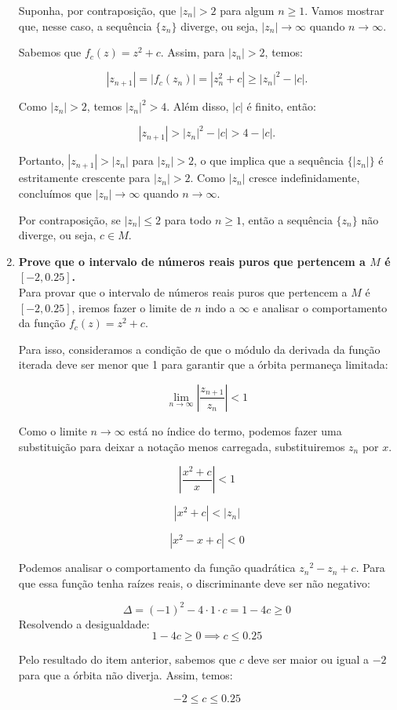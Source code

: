 \begin{enumerate}[label=(\alph*)]
        Suponha, por contraposição, que \( |z_n| > 2 \) para algum \( n \geq 1 \). Vamos mostrar que, nesse caso, a sequência \( \{z_n\} \) diverge, ou seja, \( |z_n| \to \infty \) quando \( n \to \infty \).

        Sabemos que \( f_c(z) = z^2 + c \). Assim, para \( |z_n| > 2 \), temos:

        \[
        |z_{n+1}| = |f_c(z_n)| = |z_n^2 + c| \geq |z_n|^2 - |c|.
        \]

        Como \( |z_n| > 2 \), temos \( |z_n|^2 > 4 \). Além disso, \( |c| \) é finito, então:

        \[
        |z_{n+1}| > |z_n|^2 - |c| > 4 - |c|.
        \]

        Portanto, \( |z_{n+1}| > |z_n| \) para \( |z_n| > 2 \), o que implica que a sequência \( \{|z_n|\} \) é estritamente crescente para \( |z_n| > 2 \). Como \( |z_n| \) cresce indefinidamente, concluímos que \( |z_n| \to \infty \) quando \( n \to \infty \).

        Por contraposição, se \( |z_n| \leq 2 \) para todo \( n \geq 1 \), então a sequência \( \{z_n\} \) não diverge, ou seja, \( c \in M \).


    \item \textbf{Prove que o intervalo de números reais puros que pertencem a \( M \) é \( [-2, 0.25] \). }\\
    
        Para provar que o intervalo de números reais puros que pertencem a \( M \) é \( [-2, 0.25] \), iremos fazer o limite de \( n \) indo a \( \infty \) e analisar o comportamento da função \( f_c(z) = z^2 + c \).

        Para isso, consideramos a condição de que o módulo da derivada da função iterada deve ser menor que 1 para garantir que a órbita permaneça limitada:

        \[
        \lim_{n \to \infty} \left| \frac{z_{n+1}}{z_n} \right| < 1
        \]

        Como o limite \(n \to \infty\) está no índice do termo, podemos fazer uma substituição para deixar a notação menos carregada, substituiremos \(z_n\) por \(x\).

        \[
        \left| \frac{x^2 + c}x \right| < 1
        \]

        \[
        \left| x^2 + c \right| < \left| z_n \right| 
        \]

        \[
        \left| x^2  -x + c \right| < 0
        \]

        Podemos analisar o comportamento da função quadrática \( {z_n}^2 - z_n + c \). Para que essa função tenha raízes reais, o discriminante deve ser não negativo:

        \[
        \Delta = (-1)^2 - 4 \cdot 1 \cdot
        c = 1 - 4c \geq 0
        \]
        Resolvendo a desigualdade:
        \[
        1 - 4c \geq 0 \implies c \leq 0.25
        \]


        Pelo resultado do item anterior, sabemos que \( c \) deve ser maior ou igual a \( -2 \) para que a órbita não diverja. Assim, temos:

        \[
        -2 \leq c \leq 0.25
        \]
    \end{enumerate}